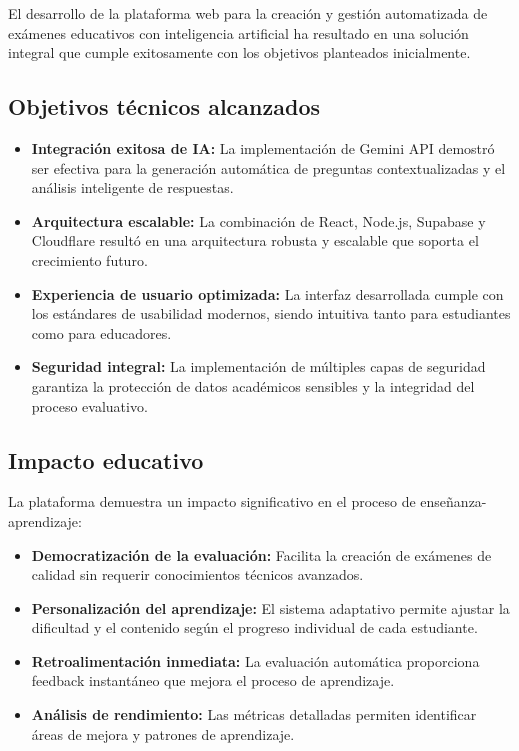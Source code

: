 \documentclass[12pt,a4paper]{report}
\begin{document}
El desarrollo de la plataforma web para la creación y gestión automatizada de exámenes educativos con inteligencia artificial ha resultado en una solución integral que cumple exitosamente con los objetivos planteados inicialmente.

\subsection{Objetivos técnicos alcanzados}

\begin{itemize}
\item \textbf{Integración exitosa de IA:} La implementación de Gemini API demostró ser efectiva para la generación automática de preguntas contextualizadas y el análisis inteligente de respuestas.

\item \textbf{Arquitectura escalable:} La combinación de React, Node.js, Supabase y Cloudflare resultó en una arquitectura robusta y escalable que soporta el crecimiento futuro.

\item \textbf{Experiencia de usuario optimizada:} La interfaz desarrollada cumple con los estándares de usabilidad modernos, siendo intuitiva tanto para estudiantes como para educadores.

\item \textbf{Seguridad integral:} La implementación de múltiples capas de seguridad garantiza la protección de datos académicos sensibles y la integridad del proceso evaluativo.
\end{itemize}

\subsection{Impacto educativo}

La plataforma demuestra un impacto significativo en el proceso de enseñanza-aprendizaje:

\begin{itemize}
\item \textbf{Democratización de la evaluación:} Facilita la creación de exámenes de calidad sin requerir conocimientos técnicos avanzados.

\item \textbf{Personalización del aprendizaje:} El sistema adaptativo permite ajustar la dificultad y el contenido según el progreso individual de cada estudiante.

\item \textbf{Retroalimentación inmediata:} La evaluación automática proporciona feedback instantáneo que mejora el proceso de aprendizaje.

\item \textbf{Análisis de rendimiento:} Las métricas detalladas permiten identificar áreas de mejora y patrones de aprendizaje.
\end{itemize}
\end{document}
